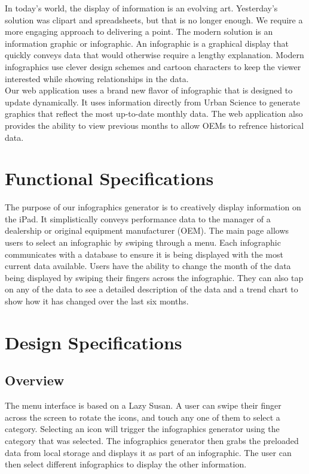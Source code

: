 \documentclass[11pt,a4paper,oneside]{article}
\begin{document}
In today's world, the display of information is an evolving art. Yesterday's solution was clipart and spreadsheets, but that is no longer enough. We require a more engaging approach to delivering a point. The modern solution is an information graphic or infographic. An infographic is a graphical display that quickly conveys data that would otherwise require a lengthy explanation. Modern infographics use clever design schemes and cartoon characters to keep the viewer interested while showing relationships in the data.\\

Our web application uses a brand new flavor of infographic that is designed to update dynamically. It uses information directly from Urban Science to generate graphics that reflect the most up-to-date monthly data. The web application also provides the ability to view previous months to allow OEMs to refrence historical data.\\

\section{Functional Specifications}
The purpose of our infographics generator is to creatively display information on the iPad.  It simplistically conveys performance data to the manager of a dealership or original equipment manufacturer (OEM).  The main page allows users to select an infographic by swiping through a menu.  Each infographic communicates with a database to ensure it is being displayed with the most current data available.  Users have the ability to change the month of the data being displayed by swiping their fingers across the infographic.  They can also tap on any of the data to see a detailed description of the data and a trend chart to show how it has changed over the last six months.\\

\section{Design Specifications}
\subsection{Overview}
The menu interface is based on a Lazy Susan. A user can swipe their finger across the screen to rotate the icons, and touch any one of them to select a category. Selecting an icon will trigger the infographics generator using the category that was selected. The infographics generator then grabs the preloaded data from local storage and displays it as part of an infographic. The user can then select different infographics to display the other information.\\
\end{document}
